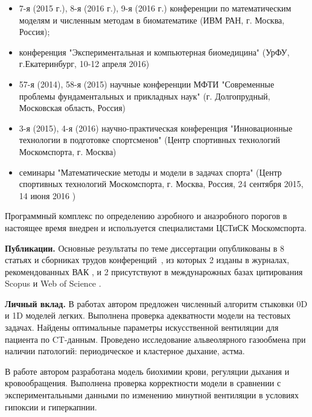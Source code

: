 \noindent
\begin{itemize}
  
  \item 7-я (2015 г.), 8-я (2016 г.), 9-я (2016 г.) конференции по математическим моделям и численным методам в биоматематике (ИВМ РАН, г. Москва, Россия); 
  
  \item конференция "Экспериментальная и компьютерная биомедицина" (УрФУ, г.Екатеринбург, 10-12 апреля 2016)
  
  \item 57-я (2014), 58-я (2015) научные конференции МФТИ "Современные проблемы фундаментальных и прикладных наук" (г. Долгопрудный, Московская область, Россия)
  
  \item 3-я (2015), 4-я (2016) научно-практическая конференция "Инновационные технологии в подготовке спортсменов" (Центр спортивных технологий Москомспорта, г. Москва)
  
  \item семинары "Математические методы и модели в задачах спорта" (Центр спортивных технологий Москомспорта, г. Москва, Россия, 24 сентября 2015, 14 июня 2016 )

\end{itemize}

Программный комплекс по определению аэробного и анаэробного порогов в настоящее время внедрен и используется специалистами ЦСТиСК Москомспорта.

\textbf{Публикации.} 
Основные результаты по теме диссертации опубликованы в 8 статьях и сборниках трудов конференций~\cite{GolovComp2017, GolovCmodel2017, GolovIt2017,GolovSp2015,GolovSp2016,TimmeSp2016,GolovEkb2016,Simakov2015}, из которых 2 изданы в журналах, рекомендованных ВАК \cite{GolovIt2017, GolovCmodel2017}, и 2 присутствуют в междунарожных базах цитирования Scopus и Web of Science \cite{GolovComp2017, GolovCmodel2017}.

\textbf{Личный вклад.}
В работах \cite{GolovComp2017,Simakov2015} автором предложен численный алгоритм стыковки 0D и 1D моделей легких. Выполнена проверка адекватности модели на тестовых задачах. Найдены оптимальные параметры искусственной вентиляции для пациента по CT-данным. Проведено исследование альвеолярного газообмена при наличии патологий: периодическое и кластерное дыхание, астма.

В работе \cite{GolovCmodel2017} автором разработана модель биохимии крови, регуляции дыхания и кровообращения. Выполнена проверка корректности модели в сравнении с экспериментальными данными по изменению минутной вентиляции в условиях гипоксии и гиперкапнии.

